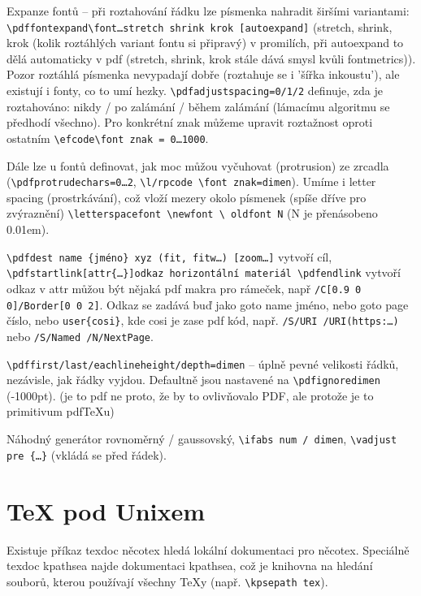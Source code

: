 \documentclass[12pt]{article}					%
\begin{document}
    \begin{definice}
            Expanze fontů -- při roztahování řádku lze písmenka nahradit širšími variantami: \verb|\pdffontexpand\font…stretch shrink krok [autoexpand]| (stretch, shrink, krok (kolik roztáhlých variant fontu si připravý) v promilích, při autoexpand to dělá automaticky v pdf (stretch, shrink, krok stále dává smysl kvůli fontmetrics)). Pozor roztáhlá písmenka nevypadají dobře (roztahuje se i 'šířka inkoustu'), ale existují i fonty, co to umí hezky. \verb|\pdfadjustspacing=0/1/2| definuje, zda je roztahováno: nikdy / po zalámání / během zalámání (lámacímu algoritmu se předhodí všechno). Pro konkrétní znak můžeme upravit roztažnost oproti ostatním \verb|\efcode\font znak = 0…1000|.
    
            Dále lze u fontů definovat, jak moc můžou vyčuhovat (protrusion) ze zrcadla (\verb|\pdfprotrudechars=0…2|, \verb|\l/rpcode \font znak=dimen|). Umíme i letter spacing (prostrkávání), což vloží mezery okolo písmenek (spíše dříve pro zvýraznění) \verb|\letterspacefont \newfont \ oldfont N| (N je přenásobeno 0.01em).
    \end{definice}

    \begin{definice}
        \verb|\pdfdest name {jméno} xyz (fit, fitw…) [zoom…]| vytvoří cíl, \verb|\pdfstartlink[attr{…}]odkaz horizontální materiál \pdfendlink| vytvoří odkaz v attr můžou být nějaká pdf makra pro rámeček, např \verb|/C[0.9 0 0]/Border[0 0 2]|. Odkaz se zadává buď jako goto name jméno, nebo goto page číslo, nebo \verb|user{cosi}|, kde cosi je zase pdf kód, např. \verb|/S/URI /URI(https:…)| nebo \verb|/S/Named /N/NextPage|.
    \end{definice}

    \begin{definice}
        \verb|\pdffirst/last/eachlineheight/depth=dimen| -- úplně pevné velikosti řádků, nezávisle, jak řádky vyjdou. Defaultně jsou nastavené na \verb|\pdfignoredimen| (-1000pt). (je to pdf ne proto, že by to ovlivňovalo PDF, ale protože je to primitivum pdfTeXu)
    \end{definice}

    \begin{definice}
        Náhodný generátor rovnoměrný / gaussovský, \verb|\ifabs num / dimen|, \verb|\vadjust pre {…}| (vkládá se před řádek).
    \end{definice}

\section{TeX pod Unixem}
    \begin{definice}
        Existuje příkaz texdoc něcotex hledá lokální dokumentaci pro něcotex. Speciálně texdoc kpathsea najde dokumentaci kpathsea, což je knihovna na hledání souborů, kterou používají všechny TeXy (např. \verb|\kpsepath tex|).
    \end{definice}
\end{document}
